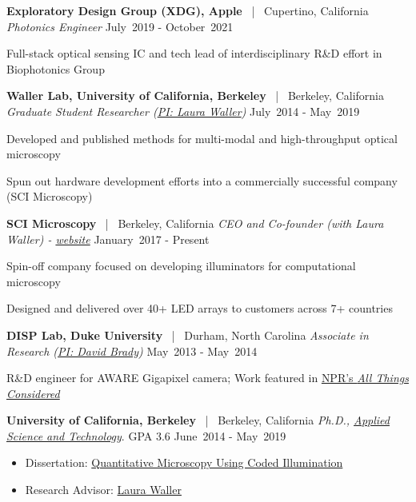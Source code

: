 \documentclass[12pt,letterpaper]{article}
\newenvironment{itemize*}%
{\begin{itemize}%
  \setlength{\itemsep}{0pt}}%
{\end{itemize}}
\newcommand{\mhead}[1]{\leavevmode\marginpar{\sffamily\footnotesize #1}}
\newcommand{\rdate}[1]{{} \hfill #1}
\begin{document}
\textbf{Exploratory Design Group (XDG), \textbf{Apple}} ~|~ Cupertino, California \newline
\emph{Photonics Engineer}  \rdate{{July~2019 - October~2021}}
\begin{itemize*}
  \item Full-stack optical sensing IC and tech lead of interdisciplinary R\&D effort in Biophotonics Group
\end{itemize*}

\smallskip
\textbf{Waller Lab, University of California, Berkeley} ~|~  Berkeley, California \newline
\emph{Graduate Student Researcher (\href{http://www.laurawaller.com}{PI: Laura Waller})} \rdate{July~2014 - May~2019}
\begin{itemize*}
  \item Developed and published methods for multi-modal and high-throughput optical microscopy
  \item Spun out hardware development efforts into a commercially successful company (SCI Microscopy)
\end{itemize*}

\smallskip
\textbf{SCI Microscopy} ~|~ Berkeley, California \newline
\emph{CEO and Co-founder (with Laura Waller) - \href{http://sci-microscopy.com}{website}}\rdate{{January~2017 - Present}}
\begin{itemize*}
  \item Spin-off company focused on developing illuminators for computational microscopy
  \item Designed and delivered over 40+ LED arrays to customers across 7+ countries
\end{itemize*}

\smallskip
\textbf{DISP Lab, \textbf{Duke University}} ~|~ Durham, North Carolina \newline
\emph{Associate in Research (\href{http://www.disp.duke.edu/}{PI: David Brady}) } \rdate{May~2013 - May~2014}
\begin{itemize*}
	\item R\&D engineer for AWARE Gigapixel camera; Work featured in \href{http://www.npr.org/2013/12/10/250000359/supercamera-more-pixels-than-you-know-what-to-do-with}{NPR's \textit{All Things Considered}}
\end{itemize*}

\medskip
\mhead{Education}%
\textbf{University of California, Berkeley} ~|~ Berkeley, California \newline
\emph{Ph.D., \href{http://ast.coe.berkeley.edu/}{Applied Science and Technology}}. GPA 3.6 \rdate{June~2014 - May~2019}
\begin{itemize}
  \item Dissertation: \href{https://escholarship.org/uc/item/70d9j190}{Quantitative Microscopy Using Coded Illumination}
  \item Research Advisor: \href{http://www.laurawaller.com}{Laura Waller}
\end{itemize}
\end{document}
